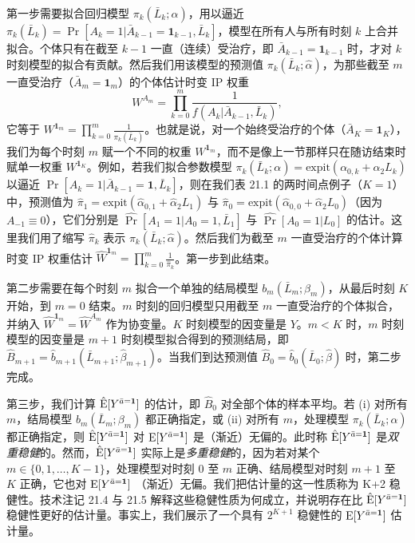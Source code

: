 第一步需要拟合回归模型 $\pi_k(\bar L_k;\alpha)$，用以逼近 $\pi_k(\bar L_k)=\Pr[A_k=1|\bar A_{k-1}=\mathbf{1}_{k-1},\bar L_k]$，模型在所有人与所有时刻 $k$ 上合并拟合。个体只有在截至 $k-1$ 一直（连续）受治疗，即 $\bar A_{k-1}=\mathbf{1}_{k-1}$ 时，才对 $k$ 时刻模型的拟合有贡献。然后我们用该模型的预测值 $\pi_k(\bar L_k;\hat\alpha)$，为那些截至 $m$ 一直受治疗（$\bar A_m=\mathbf{1}_m$）的个体估计时变 IP 权重
\[
W^{A_m}=\prod_{k=0}^{m}\frac{1}{f(A_k|\bar A_{k-1},\bar L_k)},
\]
它等于 $W^{\mathbf{1}_m}=\prod_{k=0}^{m}\frac{1}{\pi_k(\bar L_k)}$。也就是说，对一个始终受治疗的个体（$\bar A_K=\mathbf{1}_K$），我们为每个时刻 $m$ 赋一个不同的权重 $W^{\mathbf{1}_m}$，而不是像上一节那样只在随访结束时赋单一权重 $W^{\mathbf{1}_K}$。例如，若我们拟合参数模型 $\pi_k(\bar L_k;\alpha)=\mathrm{expit}(\alpha_{0,k}+\alpha_2L_k)$ 以逼近 $\Pr[A_k=1|\bar A_{k-1}=\mathbf{1},\bar L_k]$，则在我们表 21.1 的两时间点例子（$K=1$）中，预测值为 $\hat\pi_1=\mathrm{expit}(\hat\alpha_{0,1}+\hat\alpha_2L_1)$ 与 $\hat\pi_0=\mathrm{expit}(\hat\alpha_{0,0}+\hat\alpha_2L_0)$（因为 $A_{-1}\equiv0$），它们分别是 $\widehat{\Pr}[A_1=1|A_0=1,\bar L_1]$ 与 $\widehat{\Pr}[A_0=1|L_0]$ 的估计。这里我们用了缩写 $\hat\pi_k$ 表示 $\pi_k(\bar L_k;\hat\alpha)$。然后我们为截至 $m$ 一直受治疗的个体计算时变 IP 权重估计 $\hat W^{\mathbf{1}_m}=\prod_{k=0}^{m}\frac{1}{\hat\pi_k}$。第一步到此结束。

第二步需要在每个时刻 $m$ 拟合一个单独的结局模型 $b_m(\bar L_m;\beta_m)$，从最后时刻 $K$ 开始，到 $m=0$ 结束。$m$ 时刻的回归模型只用截至 $m$ 一直受治疗的个体拟合，并纳入 $\hat W^{\mathbf{1}_m}=\hat W^{A_m}$ 作为协变量。$K$ 时刻模型的因变量是 $Y$。$m<K$ 时，$m$ 时刻模型的因变量是 $m+1$ 时刻模型拟合得到的预测结局，即 $\hat B_{m+1}=\hat b_{m+1}(\bar L_{m+1};\hat\beta_{m+1})$。当我们到达预测值 $\hat B_0=\hat b_0(\bar L_0;\hat\beta)$ 时，第二步完成。


第三步，我们计算 $\hat{\mathrm{E}}[Y^{\bar a=\mathbf{1}}]$ 的估计，即 $\hat B_0$ 对全部个体的样本平均。若 (i) 对所有 $m$，结局模型 $b_m(\bar L_m;\beta_m)$ 都正确指定，或 (ii) 对所有 $m$，处理模型 $\pi_k(\bar L_k;\alpha)$ 都正确指定，则 $\hat{\mathrm{E}}[Y^{\bar a=\mathbf{1}}]$ 对 $\mathrm{E}[Y^{\bar a=\mathbf{1}}]$ 是（渐近）无偏的。此时称 $\hat{\mathrm{E}}[Y^{\bar a=\mathbf{1}}]$ 是\emph{双重稳健}的。然而，$\hat{\mathrm{E}}[Y^{\bar a=\mathbf{1}}]$ 实际上是\emph{多重稳健}的，因为若对某个 $m\in\{0,1,\dots,K-1\}$，处理模型对时刻 0 至 $m$ 正确、结局模型对时刻 $m+1$ 至 $K$ 正确，它也对 $\mathrm{E}[Y^{\bar a=\mathbf{1}}]$ （渐近）无偏。我们把估计量的这一性质称为 K+2 稳健性。技术注记 21.4 与 21.5 解释这些稳健性质为何成立，并说明存在比 $\hat{\mathrm{E}}[Y^{\bar a=\mathbf{1}}]$ 稳健性更好的估计量。事实上，我们展示了一个具有 $2^{K+1}$ 稳健性的 $\mathrm{E}[Y^{\bar a=\mathbf{1}}]$ 估计量。

